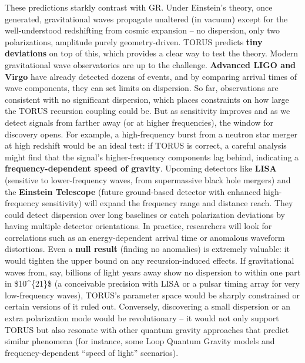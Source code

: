 \documentclass[
]{article}
\begin{document}
{These predictions starkly contrast with GR. Under Einstein's theory,
once generated, gravitational waves propagate unaltered (in vacuum)
except for the well-understood redshifting from cosmic expansion -- no
dispersion, only two polarizations, amplitude purely geometry-driven.
TORUS predicts \textbf{tiny deviations} on top of this, which provides a
clear way to test the theory. Modern gravitational wave observatories
are up to the challenge. \textbf{Advanced LIGO and Virgo} have already
detected dozens of events, and by comparing arrival times of wave
components, they can set limits on dispersion. So far, observations are
consistent with no significant dispersion, which places constraints on
how large the TORUS recursion coupling could be. But as sensitivity
improves and as we detect signals from farther away (or at higher
frequencies), the window for discovery opens. For example, a
high-frequency burst from a neutron star merger at high redshift would
be an ideal test: if TORUS is correct, a careful analysis might find
that the signal's higher-frequency components lag behind, indicating a
\textbf{frequency-dependent speed of gravity}\hspace{0pt}. Upcoming
detectors like \textbf{LISA} (sensitive to lower-frequency waves, from
supermassive black hole mergers) and the \textbf{Einstein Telescope}
(future ground-based detector with enhanced high-frequency sensitivity)
will expand the frequency range and distance reach. They could detect
dispersion over long baselines or catch polarization deviations by
having multiple detector orientations. In practice, researchers will
look for correlations such as an energy-dependent arrival time or
anomalous waveform distortions. Even a \textbf{null result} (finding no
anomalies) is extremely valuable: it would tighten the upper bound on
any recursion-induced effects. If gravitational waves from, say,
billions of light years away show no dispersion to within one part in
\$10\^{}\{21\}\$ (a conceivable precision with LISA or a pulsar timing
array for very low-frequency waves), TORUS's parameter space would be
sharply constrained or certain versions of it ruled out\hspace{0pt}.
Conversely, discovering a small dispersion or an extra polarization mode
would be revolutionary -- it would not only support TORUS but also
resonate with other quantum gravity approaches that predict similar
phenomena (for instance, some Loop Quantum Gravity models and
frequency-dependent ``speed of light'' scenarios)\hspace{0pt}.

}
\end{document}
